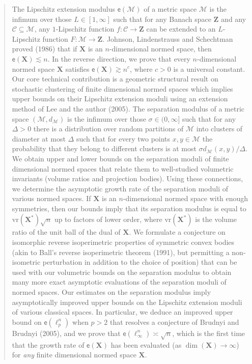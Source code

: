 \documentclass[11pt,reqno]{amsart}
\newcommand{\vr}{\mathrm{vr}}
\newcommand{\X}{\mathbf X}
\theoremstyle{remark}
\newcommand{\MM}{\mathcal{M}}
\renewcommand{\subset}{\subseteq}
\newcommand{\ee}{\mathsf{e}}
\newcommand{\bfZ}{\mathbf{Z}}
\newcommand{\sub}{\mathscr{C}}
\renewcommand{\1}{\mathbf 1}
\begin{document}
\begin{abstract}
The {Lipschitz extension modulus} $\ee(\MM)$ of a metric space $\MM$ is the infimum over those $L\in [1,\infty]$ such that for {any} Banach space $\bfZ$ and {any} $\sub\subset \MM$, {any} $1$-Lipschitz function $f:\sub\to \bfZ$ can be extended to an $L$-Lipschitz function $F:\MM\to \bfZ$. Johnson, Lindenstrauss and Schechtman proved (1986) that  if $\X$ is an $n$-dimensional normed space, then $\ee(\X)\lesssim n$. In the reverse direction, we prove that {every} $n$-dimensional normed space $\X$ satisfies  $\ee(\X)\gtrsim n^c$, where $c>0$ is a universal constant.  Our core technical contribution is a geometric structural result on stochastic clustering  of finite dimensional normed spaces which implies upper bounds on their Lipschitz extension moduli using an extension method of Lee and the author (2005). The separation modulus  of a metric space $(\MM,d_\MM)$ is the infimum over those $\sigma\in (0,\infty]$ such that for any $\Delta>0$ there is a distribution over random partitions of $\MM$ into clusters of diameter at most $\Delta$ such that for every two points $x,y\in \MM$ the probability that they belong to different clusters is at most $\sigma d_\MM(x,y)/\Delta$. We obtain upper and lower bounds on the separation moduli of  finite dimensional normed spaces that relate them to well-studied volumetric invariants (volume ratios and projection bodies). Using these connections, we determine the asymptotic growth rate of the separation moduli of various normed spaces. If $\X$ is  an $n$-dimensional normed space with enough symmetries, then our bounds imply that its separation modulus is equal to $\vr(\X^*)\sqrt{n}$ up to factors of lower order, where $\vr(\X^*)$ is  the volume ratio of the unit ball of the dual of $\X$.  We formulate a conjecture on isomorphic reverse isoperimetric properties of symmetric convex bodies (akin to Ball's reverse isoperimetric theorem (1991), but permitting a non-isometric perturbation in addition to the choice of position) that can be used with our volumetric bounds on the separation modulus to obtain many more exact asymptotic evaluations of the separation moduli of normed spaces. Our estimates on the separation modulus imply asymptotically improved upper bounds on the Lipschitz extension moduli of various classical spaces. In particular, we deduce an  improved upper bound on $\ee(\ell_p^n)$ when $p>2$ that resolves a conjecture of Brudnyi and Brudnyi (2005), and we prove that  $\ee(\ell_\infty^n)\asymp{\sqrt{n}}$,
which is the first time that the  growth rate of $\ee(\X)$ has been evaluated (as $\dim(\X)\to \infty$)  for {\em any} finite dimensional normed space $\X$.
 \end{abstract}
\end{document}
